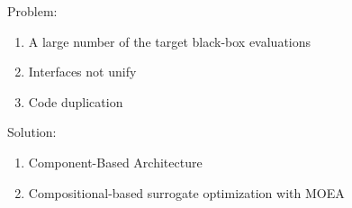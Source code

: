         Problem:
        \begin{enumerate}
            \item A large number of the target black-box evaluations
            \item Interfaces not unify
            \item Code duplication
        \end{enumerate}

        Solution:
        \begin{enumerate}
            \item Component-Based Architecture
            \item Compositional-based surrogate optimization with MOEA
        \end{enumerate}
